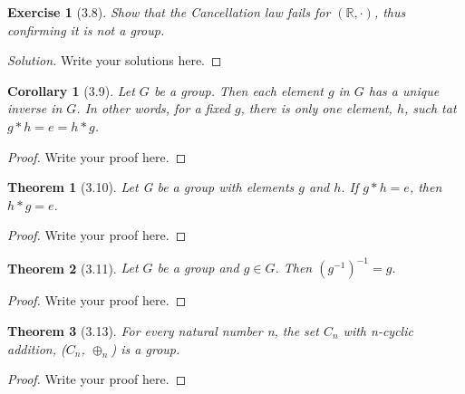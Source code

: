 \documentclass{article}
\newtheorem*{thm}{Theorem}
\newtheorem*{ex}{Exercise}
\newtheorem*{cor}{Corollary}
\newenvironment{solution}
  {\begin{proof}[Solution]}
  {\renewcommand{\qedsymbol}{}\end{proof}}
\begin{document}
\begin{ex}[3.8]
	Show that the Cancellation law fails for $(\mathbb{R}, \cdot)$, thus confirming it is not a group.
\end{ex}
\begin{solution}
    Write your solutions here.
\end{solution}

\begin{cor}[3.9]
	Let $G$ be a group. Then each element $g$ in $G$ has a unique inverse in $G$. In other words, for a fixed $g$, there is only one element, $h$, such tat $g*h = e = h*g$. 
\end{cor}
\begin{proof}
    Write your proof here.
\end{proof}

\begin{thm}[3.10]
	Let G be a group with elements $g$ and $h$. If $g*h = e$, then $h*g=e$.
\end{thm}
\begin{proof}
    Write your proof here.
\end{proof}

\begin{thm}[3.11]
	Let $G$ be a group and $g\in G$. Then $(g^{-1})^{-1} = g$. 
\end{thm}
\begin{proof}
    Write your proof here.
\end{proof}

\begin{thm}[3.13]
	For every natural number n, the set $C_n$ with n-cyclic addition, ($C_n$, $\oplus_n$) is a group.
\end{thm}
\begin{proof}
    Write your proof here.
\end{proof}
\end{document}
